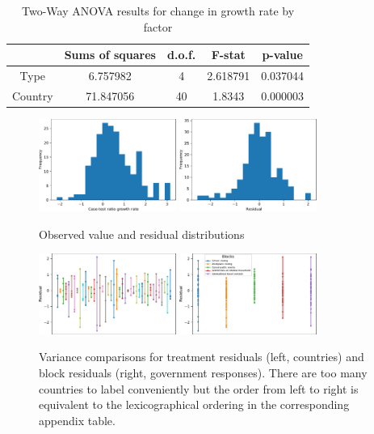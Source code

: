 \begin{table}[ht]
\centering
\caption{Two-Way ANOVA results for change in growth rate by factor}
\label{table:mganovaresults}
\begin{tabular}{|c|c|c|c|c|}
\hline
        & Sums of squares & d.o.f. & F-stat & p-value \\ \hline
Type    & 6.757982 & 4 & 2.618791 & 0.037044 \\\hline
Country & 71.847056 & 40 & 1.8343 & 0.000003 \\
\hline
\end{tabular}
\end{table}
\begin{figure}[htb!]
  \centering
\includegraphics[width=0.4\textwidth]{mg2.pdf}\label{fig:mg2}
  \hfill
\includegraphics[width=0.4\textwidth]{mg3.pdf}\label{fig:mg3}
  \caption{Observed value and residual distributions}
    \label{TCHist}
\end{figure}
\begin{figure}[htb!]
  \centering
\includegraphics[width=0.4\textwidth]{mg4.pdf}\label{fig:f1}
  \hfill
  \includegraphics[width=0.4\textwidth]{mg5.pdf}\label{fig:f2}
  \caption{Variance comparisons for treatment residuals (left, countries) and block residuals (right, government responses). There are too many countries to label conveniently but the order from left to right
  is equivalent to the lexicographical ordering in the corresponding
  appendix table.}
    \label{TCvarbar}
\end{figure}
